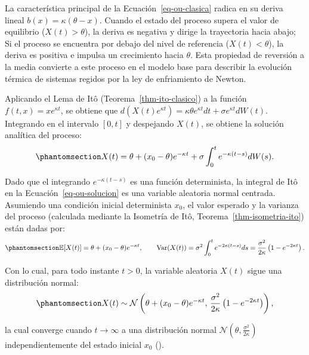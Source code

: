 \documentclass[
  spanish,
  us-letterpaper,
]{scrreprt}
\numberwithin{equation}{section}
\theoremstyle{plain}
\theoremstyle{plain}
\theoremstyle{definition}
\theoremstyle{plain}
\theoremstyle{remark}
\begin{document}
La característica principal de la Ecuación~\ref{eq-ou-clasica} radica en
su deriva lineal \(b(x) = \kappa(\theta - x)\). Cuando el estado del
proceso supera el valor de equilibrio (\(X(t) > \theta\)), la deriva es
negativa y dirige la trayectoria hacia abajo; Si el proceso se encuentra
por debajo del nivel de referencia (\(X(t) < \theta\)), la deriva es
positiva e impulsa un crecimiento hacia \(\theta\). Esta propiedad de
reversión a la media convierte a este proceso en el modelo base para
describir la evolución térmica de sistemas regidos por la ley de
enfriamiento de Newton.

Aplicando el Lema de Itô (Teorema~\ref{thm-ito-clasico}) a la función
\(f(t, x) = x e^{\kappa t}\), se obtiene que
\(d(X(t)e^{\kappa t}) = \kappa \theta e^{\kappa t} dt + \sigma e^{\kappa t} dW(t)\).
Integrando en el intervalo \([0, t]\) y despejando \(X(t)\), se obtiene
la solución analítica del proceso:
\begin{equation}\phantomsection\label{eq-ou-solucion}{
X(t) = \theta + (x_0 - \theta)e^{-\kappa t} + \sigma \int_0^t e^{-\kappa(t-s)} dW(s).
}\end{equation}

Dado que el integrando \(e^{-\kappa(t-s)}\) es una función determinista,
la integral de Itô en la Ecuación~\ref{eq-ou-solucion} es una variable
aleatoria normal centrada. Asumiendo una condición inicial determinista
\(x_0\), el valor esperado y la varianza del proceso (calculada mediante
la Isometría de Itô, Teorema~\ref{thm-isometria-ito}) están dadas por:
\begin{equation}\phantomsection\label{eq-ou-moments}{
\mathbb{E}[X(t)] = \theta + (x_0 - \theta)e^{-\kappa t}, \qquad \text{Var}(X(t)) = \sigma^2 \int_0^t e^{-2\kappa(t-s)} ds = \frac{\sigma^2}{2\kappa}\left(1 - e^{-2\kappa t}\right).
}\end{equation}

Con lo cual, para todo instante \(t > 0\), la variable aleatoria
\(X(t)\) sigue una distribución normal:
\begin{equation}\phantomsection\label{eq-ou-distribucion}{
X(t) \sim \mathcal{N}\left( \theta + (x_0 - \theta)e^{-\kappa t}, \, \frac{\sigma^2}{2\kappa}\left(1 - e^{-2\kappa t}\right) \right),
}\end{equation}

la cual converge cuando \(t \to \infty\) a una distribución normal
\(\mathcal{N}\left(\theta, \frac{\sigma^2}{2\kappa}\right)\)
independientemente del estado inicial \(x_0\)
().
\end{document}
